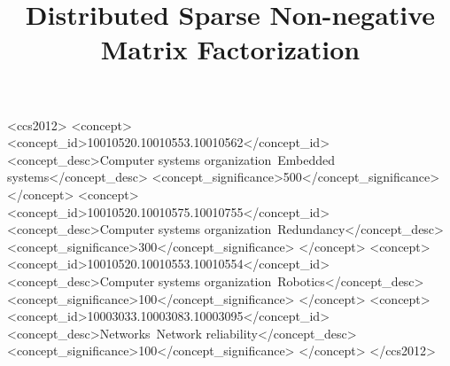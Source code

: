 \documentclass[sigconf, review=true]{acmart}
\begin{document}
\title{Distributed Sparse Non-negative Matrix Factorization}

%
%
\begin{CCSXML}
<ccs2012>
 <concept>
  <concept_id>10010520.10010553.10010562</concept_id>
  <concept_desc>Computer systems organization~Embedded systems</concept_desc>
  <concept_significance>500</concept_significance>
 </concept>
 <concept>
  <concept_id>10010520.10010575.10010755</concept_id>
  <concept_desc>Computer systems organization~Redundancy</concept_desc>
  <concept_significance>300</concept_significance>
 </concept>
 <concept>
  <concept_id>10010520.10010553.10010554</concept_id>
  <concept_desc>Computer systems organization~Robotics</concept_desc>
  <concept_significance>100</concept_significance>
 </concept>
 <concept>
  <concept_id>10003033.10003083.10003095</concept_id>
  <concept_desc>Networks~Network reliability</concept_desc>
  <concept_significance>100</concept_significance>
 </concept>
</ccs2012>  
\end{CCSXML}




\maketitle



%







%

 

%
\end{document}
